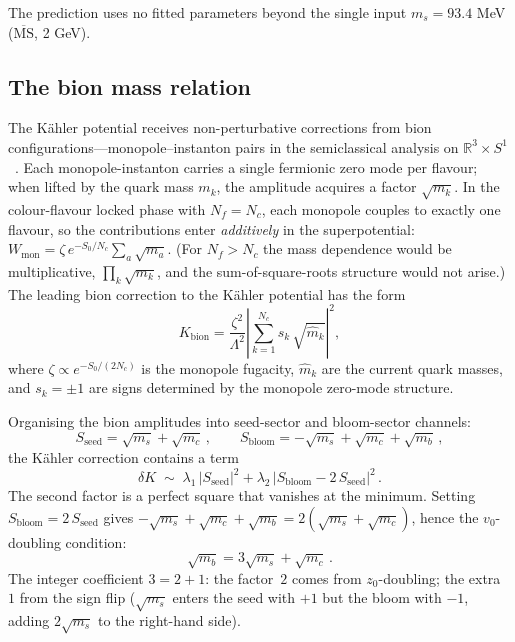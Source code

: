 \documentclass[12pt,a4paper]{article}
\begin{document}
The prediction uses no fitted parameters beyond the single input
$m_s = 93.4$ MeV ($\overline{\mathrm{MS}}$, 2 GeV).

\subsection{The bion mass relation}

The K\"ahler potential receives non-perturbative corrections from
bion configurations---monopole--instanton pairs in the semiclassical
analysis on $\mathbb{R}^3 \times S^1$~\cite{Unsal2008}. Each
monopole-instanton carries
a single fermionic zero mode per flavour; when lifted by the quark
mass $m_k$, the amplitude acquires a factor $\sqrt{m_k}$.
In the colour-flavour locked phase with $N_f = N_c$, each monopole
couples to exactly one flavour, so the contributions enter
\emph{additively} in the superpotential:
$W_{\mathrm{mon}} = \zeta\,e^{-S_0/N_c}\sum_a \sqrt{m_a}$.
(For $N_f > N_c$ the mass dependence would be multiplicative,
$\prod_k \sqrt{m_k}$, and the sum-of-square-roots structure
would not arise.)
The leading bion correction to the K\"ahler potential has the form
\begin{equation}
K_{\mathrm{bion}}
= \frac{\zeta^2}{\Lambda^2}
\left|\sum_{k=1}^{N_c} s_k\,\sqrt{\hat{m}_k}\right|^2,
\end{equation}
where $\zeta \propto e^{-S_0/(2N_c)}$ is the monopole fugacity,
$\hat{m}_k$ are the current quark masses, and $s_k = \pm 1$ are signs
determined by the monopole zero-mode structure.

Organising the bion amplitudes into seed-sector and bloom-sector
channels:
\begin{equation}
S_{\mathrm{seed}} = \sqrt{m_s} + \sqrt{m_c}\,,
\qquad
S_{\mathrm{bloom}} = -\sqrt{m_s} + \sqrt{m_c} + \sqrt{m_b}\,,
\end{equation}
the K\"ahler correction contains a term
\begin{equation}
\delta K
\;\sim\;
\lambda_1\,|S_{\mathrm{seed}}|^2
+ \lambda_2\,|S_{\mathrm{bloom}} - 2\,S_{\mathrm{seed}}|^2\,.
\end{equation}
The second factor is a perfect square that vanishes at the minimum.
Setting $S_{\mathrm{bloom}} = 2\,S_{\mathrm{seed}}$ gives
$-\sqrt{m_s} + \sqrt{m_c} + \sqrt{m_b}
  = 2(\sqrt{m_s} + \sqrt{m_c})$,
hence the $v_0$-doubling condition:
\begin{equation}
\boxed{\sqrt{m_b}
= 3\sqrt{m_s} + \sqrt{m_c}\,.}
\end{equation}
The integer coefficient $3 = 2 + 1$: the factor~$2$ comes from
$z_0$-doubling; the extra~$1$ from the sign flip ($\sqrt{m_s}$
enters the seed with $+1$ but the bloom with $-1$, adding
$2\sqrt{m_s}$ to the right-hand side).
\end{document}
